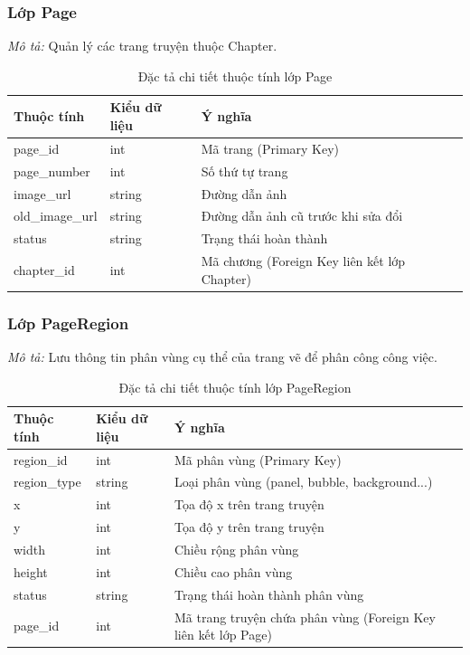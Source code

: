 \subsubsection{Lớp Page}
\textit{Mô tả:} Quản lý các trang truyện thuộc Chapter.

\begin{table}[H]
\centering
\renewcommand{\arraystretch}{1.3}
\begin{tabularx}{\textwidth}{|p{4cm}|p{3cm}|>{\raggedright\arraybackslash}X|}
\hline
\rowcolor{tableheader}
\textbf{Thuộc tính} & \textbf{Kiểu dữ liệu} & \textbf{Ý nghĩa} \\ \hline
page\_id & int & Mã trang (Primary Key) \\ \hline
page\_number & int & Số thứ tự trang \\ \hline
image\_url & string & Đường dẫn ảnh \\ \hline
old\_image\_url & string & Đường dẫn ảnh cũ trước khi sửa đổi \\ \hline
status & string & Trạng thái hoàn thành \\ \hline
chapter\_id & int & Mã chương (Foreign Key liên kết lớp Chapter) \\ \hline
\end{tabularx}
\caption{Đặc tả chi tiết thuộc tính lớp Page}
\label{tab:class_page}
\end{table}


\subsubsection{Lớp PageRegion}
\textit{Mô tả:} Lưu thông tin phân vùng cụ thể của trang vẽ để phân công công việc.

\begin{table}[H]
\centering
\renewcommand{\arraystretch}{1.3}
\begin{tabularx}{\textwidth}{|p{4cm}|p{3cm}|>{\raggedright\arraybackslash}X|}
\hline
\rowcolor{tableheader}
\textbf{Thuộc tính} & \textbf{Kiểu dữ liệu} & \textbf{Ý nghĩa} \\ \hline
region\_id & int & Mã phân vùng (Primary Key) \\ \hline
region\_type & string & Loại phân vùng (panel, bubble, background...) \\ \hline
x & int & Tọa độ x trên trang truyện \\ \hline
y & int & Tọa độ y trên trang truyện \\ \hline
width & int & Chiều rộng phân vùng \\ \hline
height & int & Chiều cao phân vùng \\ \hline
status & string & Trạng thái hoàn thành phân vùng \\ \hline
page\_id & int & Mã trang truyện chứa phân vùng (Foreign Key liên kết lớp Page) \\ \hline
\end{tabularx}
\caption{Đặc tả chi tiết thuộc tính lớp PageRegion}
\label{tab:class_pageregion}
\end{table}


